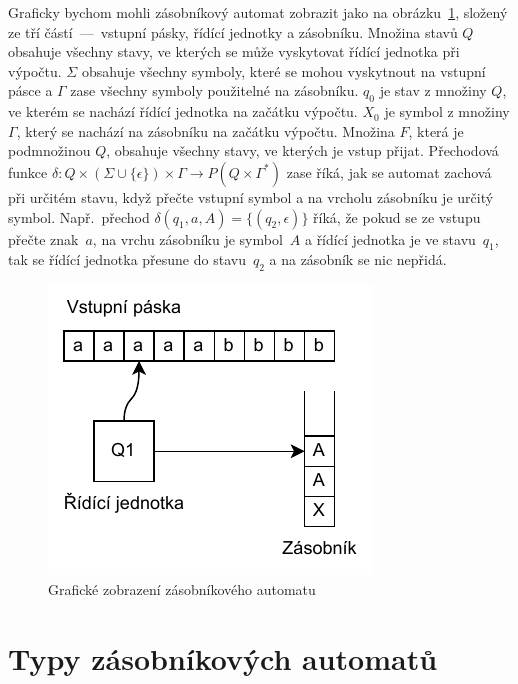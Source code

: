 Graficky bychom mohli zásobníkový automat zobrazit jako na obrázku~\ref{fig:PDAComponents}, složený ze tří částí~---~vstupní pásky, řídící jednotky a zásobníku. Množina stavů $Q$ obsahuje všechny stavy, ve kterých se může vyskytovat řídící jednotka při výpočtu. $\Sigma$ obsahuje všechny symboly, které se mohou vyskytnout na vstupní pásce a $\Gamma$ zase všechny symboly použitelné na zásobníku. $q_0$ je stav z množiny $Q$, ve kterém se nachází řídící jednotka na začátku výpočtu. $X_0$ je symbol z množiny $\Gamma$, který se nachází na zásobníku na začátku výpočtu. Množina $F$, která je podmnožinou $Q$, obsahuje všechny stavy, ve kterých je vstup přijat. Přechodová funkce $\delta : Q \times (\Sigma \cup \{\epsilon\}) \times \Gamma \rightarrow P(Q \times \Gamma^*)$ zase říká, jak se automat zachová při určitém stavu, když přečte vstupní symbol a na vrcholu zásobníku je určitý symbol. Např.\ přechod $\delta(q_1,a,A) = \{(q_2,\epsilon)\}$ říká, že pokud se ze vstupu přečte znak~$a$, na vrchu zásobníku je symbol~$A$ a řídící jednotka je ve stavu~$q_1$, tak se řídící jednotka přesune do stavu~$q_2$ a na zásobník se nic nepřidá.

\begin{figure}[h]
    \centering
    \includegraphics{Figures/PDAComponents.drawio.pdf}
    \caption{Grafické zobrazení zásobníkového automatu}\label{fig:PDAComponents}
\end{figure}

\section{Typy zásobníkových automatů}\label{sec:TypesOfPDA}

